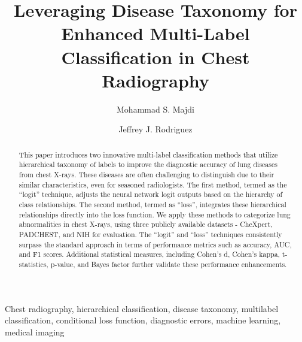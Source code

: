 \documentclass[authoryear,preprint,review,12pt]{elsarticle}
\begin{document}
\begin{frontmatter}

    \title{Leveraging Disease Taxonomy for Enhanced Multi-Label Classification in Chest Radiography}
    \author[]{Mohammad S\@. Majdi}
    \author[]{Jeffrey J\@. Rodriguez}

    \begin{abstract}
        This paper introduces two innovative multi-label classification methods that utilize hierarchical taxonomy of labels to improve the diagnostic accuracy of lung diseases from chest X-rays. These diseases are often challenging to distinguish due to their similar characteristics, even for seasoned radiologists. The first method, termed as the ``logit'' technique, adjusts the neural network logit outputs based on the hierarchy of class relationships. The second method, termed as ``loss'', integrates these hierarchical relationships directly into the loss function. We apply these methods to categorize lung abnormalities in chest X-rays, using three publicly available datasets - CheXpert, PADCHEST, and NIH for evaluation. The ``logit'' and ``loss'' techniques consistently surpass the standard approach in terms of performance metrics such as accuracy, AUC, and F1 scores. Additional statistical measures, including Cohen's d, Cohen's kappa, t-statistics, p-value, and Bayes factor further validate these performance enhancements.
    \end{abstract}
    \begin{keyword}
        Chest radiography, hierarchical classification, disease taxonomy, multilabel classification, conditional loss function, diagnostic errors, machine learning, medical imaging
    \end{keyword}


\end{frontmatter}
\end{document}
